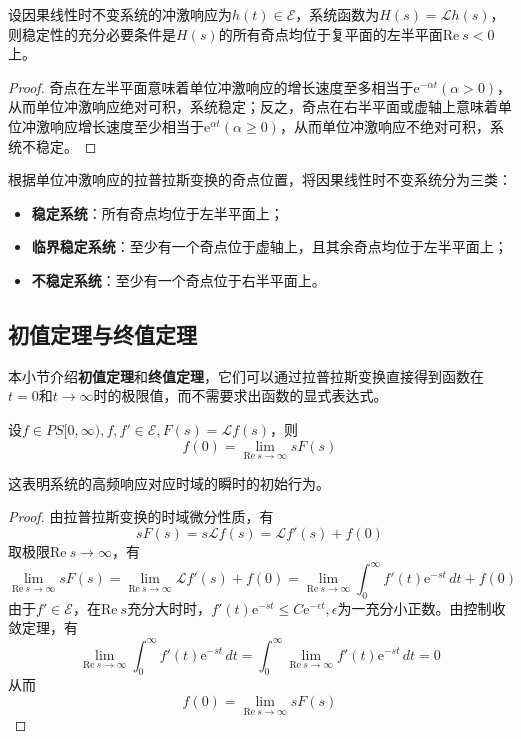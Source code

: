 \documentclass{ctexbook}
\begin{document}
\begin{proposition}[稳定性的复频域判则]
    设因果线性时不变系统的冲激响应为$h(t)\in\mathcal{E}$，系统函数为$H(s)=\mathcal{L} h(s)$，则稳定性的充分必要条件是$H(s)$的所有奇点均位于复平面的左半平面$\text{Re}\ s<0$上。
\end{proposition}
\begin{proof}
    奇点在左半平面意味着单位冲激响应的增长速度至多相当于$\mathrm{e}^{-\alpha t}( \alpha>0)$，从而单位冲激响应绝对可积，系统稳定；反之，奇点在右半平面或虚轴上意味着单位冲激响应增长速度至少相当于$\mathrm{e}^{\alpha t}(\alpha\geq0)$，从而单位冲激响应不绝对可积，系统不稳定。
\end{proof}
\begin{definition}
    根据单位冲激响应的拉普拉斯变换的奇点位置，将因果线性时不变系统分为三类：
    \begin{itemize}
        \item \textbf{稳定系统}：所有奇点均位于左半平面上；
        \item \textbf{临界稳定系统}：至少有一个奇点位于虚轴上，且其余奇点均位于左半平面上；
        \item \textbf{不稳定系统}：至少有一个奇点位于右半平面上。
    \end{itemize}
\end{definition}

\subsection{初值定理与终值定理}\label{sub:initial_and_final_value}
本小节介绍\textbf{初值定理}和\textbf{终值定理}，它们可以通过拉普拉斯变换直接得到函数在$t=0$和$t\to\infty$时的极限值，而不需要求出函数的显式表达式。
\begin{theorem}[初值定理]
    设$f\in PS[0,\infty),f,f'\in\mathcal{E},F(s)=\mathcal{L} f(s)$，则
    \[f(0)=\lim_{\text{Re}\ s\to\infty}sF(s)\]
\end{theorem}
这表明系统的高频响应对应时域的瞬时的初始行为。
\begin{proof}
    由拉普拉斯变换的时域微分性质，有
    \[sF(s)=s\mathcal{L} f(s)=\mathcal{L} f'(s)+f(0)\]
    取极限$\text{Re}\ s\to\infty$，有
    \[\lim_{\text{Re}\ s\to\infty}sF(s)=\lim_{\text{Re}\ s\to\infty}\mathcal{L} f'(s)+f(0)=\lim_{\text{Re}\ s\to\infty}\int_{0}^{\infty}f'(t)\mathrm{e}^{-st}\,dt+f(0)\]
    由于$f'\in\mathcal{E} $，在$\text{Re}\ s$充分大时时，$f'(t)\mathrm{e}^{-st}\leq C \mathrm{e}^{-\epsilon t},\epsilon$为一充分小正数。由控制收敛定理，有
    \[\lim_{\text{Re}\ s\to\infty}\int_{0}^{\infty}f'(t)\mathrm{e}^{-st}\,dt=\int_{0}^{\infty}\lim_{\text{Re}\ s\to\infty}f'(t)\mathrm{e}^{-st}\,dt=0\]
    从而\[f(0)=\lim_{\text{Re}\ s\to\infty}sF(s)\]
\end{proof}
\end{document}
